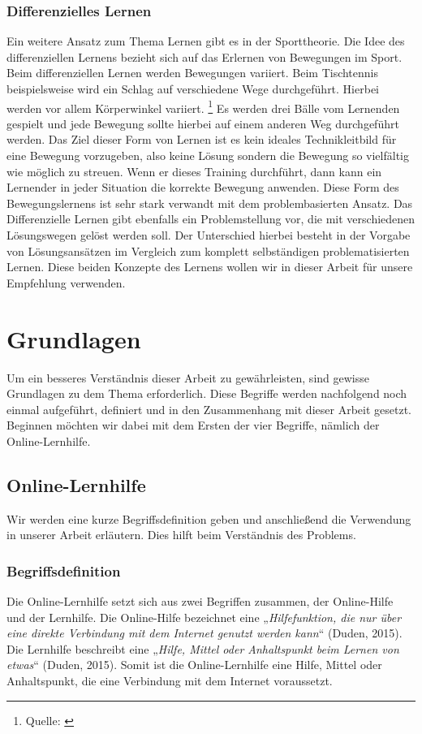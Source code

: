 \subsection{Differenzielles Lernen}
Ein weitere Ansatz zum Thema Lernen gibt es in der Sporttheorie. Die Idee des differenziellen Lernens bezieht sich auf das Erlernen von Bewegungen im Sport. Beim differenziellen Lernen werden Bewegungen variiert. Beim Tischtennis beispielsweise wird ein Schlag auf verschiedene Wege durchgeführt. Hierbei werden vor allem Körperwinkel variiert. \footnote{Quelle: \cite{differenziellesLernen}} Es werden drei Bälle vom Lernenden gespielt und jede Bewegung sollte hierbei auf einem anderen Weg durchgeführt werden. Das Ziel dieser Form von Lernen ist es kein ideales Technikleitbild für eine Bewegung vorzugeben, also keine Lösung sondern die Bewegung so vielfältig wie möglich zu streuen. Wenn er dieses Training durchführt, dann kann ein Lernender in jeder Situation die korrekte Bewegung anwenden. Diese Form des Bewegungslernens ist sehr stark verwandt mit dem problembasierten Ansatz. Das Differenzielle Lernen gibt ebenfalls ein Problemstellung vor, die mit verschiedenen Lösungswegen gelöst werden soll. Der Unterschied hierbei besteht in der Vorgabe von Lösungsansätzen im Vergleich zum komplett selbständigen problematisierten Lernen.  Diese beiden Konzepte des Lernens wollen wir in dieser Arbeit für unsere Empfehlung verwenden.


\chapter{Grundlagen}
Um ein besseres Verständnis dieser Arbeit zu gewährleisten, sind gewisse Grundlagen zu dem Thema erforderlich. Diese Begriffe werden nachfolgend noch einmal aufgeführt, definiert und in den Zusammenhang mit dieser Arbeit gesetzt. Beginnen möchten wir dabei mit dem Ersten der vier Begriffe, nämlich der Online-Lernhilfe.
\section{Online-Lernhilfe}
Wir werden eine kurze Begriffsdefinition geben und anschließend die Verwendung in unserer Arbeit erläutern. Dies hilft beim Verständnis des Problems.
\subsection{Begriffsdefinition}
Die Online-Lernhilfe setzt sich aus zwei Begriffen zusammen, der Online-Hilfe und der Lernhilfe. Die Online-Hilfe bezeichnet eine „\textit{Hilfefunktion, die nur über eine direkte Verbindung mit dem Internet genutzt werden kann}“ (Duden, 2015). Die Lernhilfe beschreibt eine „\textit{Hilfe, Mittel oder Anhaltspunkt beim Lernen von etwas}“ (Duden, 2015). Somit ist die Online-Lernhilfe eine Hilfe, Mittel oder Anhaltspunkt, die eine Verbindung mit dem Internet voraussetzt.

